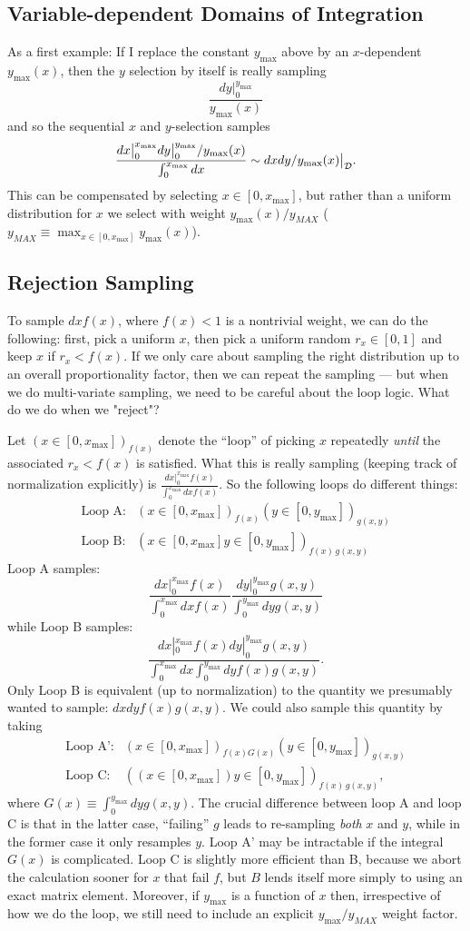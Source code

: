 \documentclass[11pt]{article}
\newcommand{\be}{\begin{equation}}
\newcommand{\ee}{\end{equation}}
\newcommand{\bea}{\begin{eqnarray}}
\newcommand{\eea}{\end{eqnarray}}
\begin{document}
\subsection{Variable-dependent Domains of Integration}\label{domains}
As a first example: If I replace the constant $y_{\max}$ above by  an $x$-dependent $y_{\max}(x)$, then the $y$ selection by itself is really sampling  
\be
\frac{dy \big|_0^{y_{\max}}}{y_{\max}(x)}
\ee
and so the sequential $x$ and $y$-selection samples
\be
\frac{dx \big|_0^{x_{\max}} dy \big|_0^{y_{\max}}/{y_{\max}(x)}}{\int_0^{x_{\max}} dx } \sim dx dy/y_{\max}(x) \big|_{\cal D}.
\ee
This can be compensated by selecting $x\in [0,x_{{\max}}]$, but rather than a uniform distribution for $x$ we select with weight $y_{\max}(x)/y_{MAX}$ ($y_{MAX} \equiv {\max}_{x\in[0,x_{\max}]} y_{\max}(x)$).

\subsection{Rejection Sampling}\label{rejection}
To sample $dx f(x)$, where $f(x) <1$ is a nontrivial weight, we can do the following: first, pick a uniform $x$, then pick a uniform random $r_x\in [0,1]$ and keep $x$ if $r_x< f(x)$.  If we only care about sampling the right distribution up to an overall proportionality factor, then we can repeat the sampling --- but when we do multi-variate sampling, we need to be careful about the loop logic.   What do we do when we "reject"? 

Let $(x\in  [0,x_{{\max}}])_{f(x)}$ denote the ``loop'' of picking $x$ repeatedly \emph{until} the associated $r_x < f(x)$ is satisfied.  
What this is really sampling (keeping track of normalization explicitly) is $\frac{dx|_0^{x_{\max}} f(x)}{\int_0^{x_{\max}} dx f(x)}$.
So the following loops do different things:
\bea
\textrm{Loop A:} &  (x\in  [0,x_{\max}])_{f(x)}  (y\in  [0,y_{\max}])_{g(x,y)}\\
\textrm{Loop B:} & (x\in  [0,x_{\max}] y\in  [0,y_{\max}])_{f(x)\,g(x,y)}
\eea
Loop A samples:
\be
\frac{dx|_0^{x_{\max}} f(x)}{\int_0^{x_{\max}} dx f(x)} \frac{dy|_0^{y_{\max}} g(x,y)}{\int_0^{y_{\max}} dy g(x,y)}
\ee
while Loop B samples:
\be
\frac{dx|_0^{x_{\max}} f(x) dy|_0^{y_{\max}} g(x,y)}{\int_0^{x_{\max}} dx \int_0^{y_{\max}} dy f(x) g(x,y)}.
\ee
Only Loop B is equivalent (up to normalization) to the quantity we presumably wanted to sample:  $dx dy f(x) g(x,y)$.
We could also sample this quantity by taking 
\bea
\textrm{Loop A':} &  (x\in  [0,x_{\max}])_{f(x) G(x)}  (y\in  [0,y_{\max}])_{g(x,y)}\\
\textrm{Loop C:} & \left((x\in  [0,x_{\max}]) y\in  [0,y_{\max}]\right)_{f(x)\,g(x,y)},
\eea
where $G(x)\equiv  \int_0^{y_{\max}} dy g(x,y)$.  The crucial difference between loop A and loop C is that in the latter case, ``failing'' $g$ leads to re-sampling \emph{both} $x$ and $y$, while in the former case it only resamples $y$.   Loop A' may be intractable if the integral $G(x)$ is complicated.  Loop C is slightly more efficient than B, because we abort the calculation sooner for $x$ that fail $f$, but $B$ lends itself more simply to using an exact matrix element.  Moreover, if $y_{\max}$ is a function of $x$ then, irrespective of how we do the loop, we still need to include an explicit $y_{\max}/y_{MAX}$ weight factor.  
\end{document}
